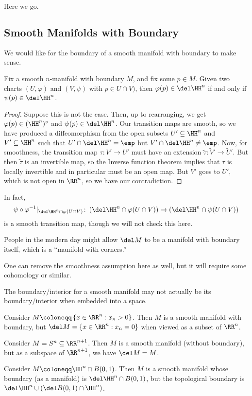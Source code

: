 \documentclass[../notes.tex]{subfiles}
\begin{document}
Here we go.

\subsection{Smooth Manifolds with Boundary}
We would like for the boundary of a smooth manifold with boundary to make sense.
\begin{theorem} \label{thm:boundary-makes-sense}
	Fix a smooth $n$-manifold with boundary $M$, and fix some $p\in M$. Given two charts $(U,\varphi)$ and $(V,\psi)$ with $p\in U\cap V)$, then $\varphi(p)\in\del\HH^n$ if and only if $\psi(p)\in\del\HH^n$.
\end{theorem}
\begin{proof}
	Suppose this is not the case. Then, up to rearranging, we get $\varphi(p)\in(\HH^n)^\circ$ and $\psi(p)\in\del\HH^n$. Our transition maps are smooth, so we have produced a diffeomorphism from the open subsets $U'\subseteq\HH^n$ and $V'\subseteq\HH^n$ such that $U'\cap\del\HH^n=\emp$ but $V'\cap\del\HH^n\ne\emp$. Now, for smoothness, the transition map $\tau\colon V'\to U'$ must have an extension $\widetilde\tau\colon\widetilde V'\to\widetilde U'$. But then $\widetilde\tau$ is an invertible map, so the Inverse function theorem implies that $\tau$ is locally invertible and in particular must be an open map. But $V'$ goes to $U'$, which is not open in $\RR^n$, so we have our contradiction.
\end{proof}
\begin{remark}
	In fact,
	\[\psi\circ\varphi^{-1}|_{\del\HH^n\cap\varphi(U\cap V)}\colon\left(\del\HH^n\cap\varphi(U\cap V)\right)\to\left(\del\HH^n\cap\psi(U\cap V)\right)\]
	is a smooth transition map, though we will not check this here.
\end{remark}
\begin{remark}
	People in the modern day might allow $\del M$ to be a manifold with boundary itself, which is a ``manifold with corners.''
\end{remark}
\begin{remark}
	One can remove the smoothness assumption here as well, but it will require some cohomology or similar.
\end{remark}
The boundary/interior for a smooth manifold may not actually be its boundary/interior when embedded into a space.
\begin{example}
	Consider $M\coloneqq\left\{x\in\RR^n:x_n>0\right\}$. Then $M$ is a smooth manifold with boundary, but $\del M=\left\{x\in\RR^n:x_n=0\right\}$ when viewed as a subset of $\RR^n$.
\end{example}
\begin{example}
	Consider $M=S^n\subseteq\RR^{n+1}$. Then $M$ is a smooth manifold (without boundary), but as a subspace of $\RR^{n+1}$, we have $\del M=M$.
\end{example}
\begin{example}
	Consider $M\coloneqq\HH^n\cap B(0,1)$. Then $M$ is a smooth manifold whose boundary (as a manifold) is $\del\HH^n\cap B(0,1)$, but the topological boundary is $\del\HH^n\cup(\del B(0,1)\cap\HH^n)$.
\end{example}
\end{document}
